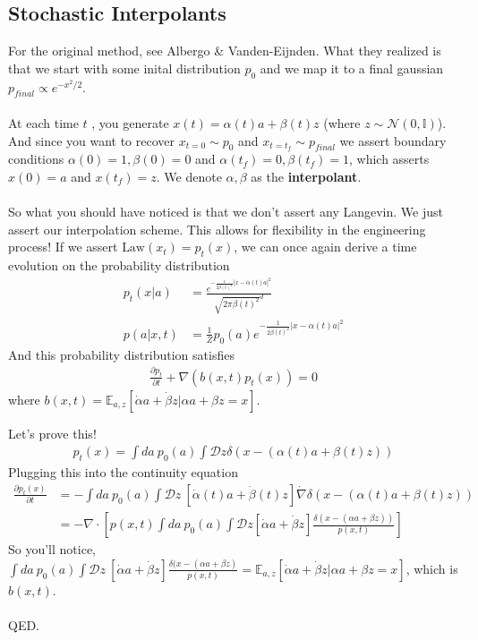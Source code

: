 \subsection{Stochastic Interpolants}
For the original method, see Albergo \& Vanden-Eijnden.  What they realized is that we start with some inital distribution $p_0$ and we map it to a final gaussian $p_{final} \propto e^{-x^2/2}$. \\
\\
At each time $t$ , you generate $x(t) = \alpha(t) a + \beta(t) z$ (where $z \sim \mathcal N(0,\mathbb I)$). And since you want to recover $x_{t=0} \sim p_0$ and $x_{t=t_f} \sim p_{final}$ we assert boundary conditions $\alpha(0) = 1, \beta(0) = 0$ and $\alpha(t_f) = 0 , \beta(t_f) = 1$, which asserts $x(0) = a$ and $x(t_f) = z$. We denote $\alpha,\beta$ as the \textbf{interpolant}. \\
\\
So what you should have noticed is that we don't assert any Langevin. We just assert our interpolation scheme. This allows for flexibility in the engineering process! If we assert $\text{Law}(x_t) = p_t(x)$, we can once again derive a time evolution on the probability distribution
\begin{align}
	p_t(x|a) & = \frac{e^{-\frac{1}{2\beta(t)^2}|x-\alpha(t) a|^2}}{\sqrt{2\pi \beta(t)^2}^d}\\
	p(a|x,t) & = \frac{1}{Z}p_0(a) e^{-\frac{1}{2\beta(t)^2} |x-\alpha(t) a|^2}
\end{align} 
And this probability distribution satisfies
\begin{align}
	\frac{\partial p_t}{\partial t} + \nabla (b(x,t) p_t(x)) = 0 \label{eqn:stochasticInterpolant_probability}
\end{align}
where $b(x,t) = \mathbb E_{a,z} [\dot \alpha a + \dot \beta z | \alpha a+ \beta z = x]$. 
\begin{sidework}
	Let's prove this!
	\begin{align}
		p_t(x) = \int da~ p_0(a) \int \mathcal Dz \delta(x - (\alpha(t) a + \beta(t) z))
	\end{align}
	Plugging this into the continuity equation
	\begin{align}
		\frac{\partial p_t(x)}{\partial t} & = - \int da~ p_0(a) \int \mathcal Dz ~[\dot \alpha(t) a + \dot \beta(t)z] \dot \nabla \delta(x - (\alpha(t) a + \beta(t) z))\\
		& = - \nabla \cdot \left[ p(x,t) \int da ~p_0(a) \int \mathcal Dz [\dot \alpha a + \dot \beta z] \frac{\delta (x - (\alpha a + \beta z))}{p(x,t)} \right]
	\end{align}
	So you'll notice, $\int da ~ p_0(a) \int \mathcal Dz~[\dot \alpha a + \dot \beta z] \frac{\delta(x - (\alpha a  +\beta z)}{p(x,t)} = \mathbb E_{a,z} [ \dot \alpha a  + \dot \beta z | \alpha a  + \beta z = x]$, which is $b(x,t)$.\\
	\\
	QED.
\end{sidework}
